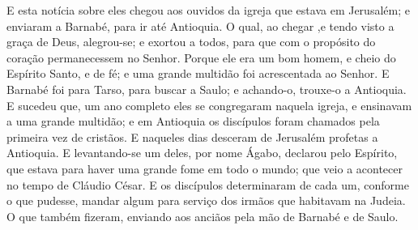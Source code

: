 {E esta notícia sobre eles chegou aos ouvidos da igreja que estava em Jerusalém; e enviaram a Barnabé, para ir até Antioquia.
O qual, ao chegar
{} ,e tendo visto a graça de Deus, alegrou-se; e exortou a todos, para que com o propósito do coração permanecessem no Senhor.
Porque ele era um bom homem, e cheio do Espírito Santo, e de fé; e uma grande multidão foi acrescentada ao Senhor.
E Barnabé foi para Tarso, para buscar a Saulo; e achando-o, trouxe-o a Antioquia.
E sucedeu que,
{} um ano completo eles se congregaram naquela igreja, e ensinavam a uma grande multidão; e em Antioquia os discípulos foram chamados pela primeira vez de cristãos.
E naqueles dias desceram de Jerusalém
{} profetas a Antioquia.
E levantando-se um deles, por nome Ágabo, declarou pelo Espírito, que estava para haver uma grande fome em todo o mundo; que veio a acontecer no tempo de Cláudio César.
E os discípulos determinaram de cada um, conforme o que pudesse, mandar algum
{} para serviço dos irmãos que habitavam na Judeia.
O que também fizeram, enviando
{} aos anciãos
 pela mão de Barnabé e de Saulo.

}
